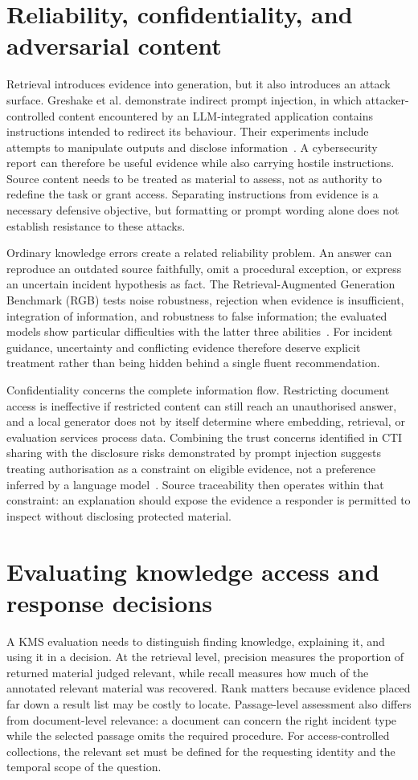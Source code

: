 \section{Reliability, confidentiality, and adversarial content}
Retrieval introduces evidence into generation, but it also introduces an attack surface. Greshake et al. demonstrate indirect prompt injection, in which attacker-controlled content encountered by an LLM-integrated application contains instructions intended to redirect its behaviour. Their experiments include attempts to manipulate outputs and disclose information~\cite{ref045}. A cybersecurity report can therefore be useful evidence while also carrying hostile instructions. Source content needs to be treated as material to assess, not as authority to redefine the task or grant access. Separating instructions from evidence is a necessary defensive objective, but formatting or prompt wording alone does not establish resistance to these attacks.

Ordinary knowledge errors create a related reliability problem. An answer can reproduce an outdated source faithfully, omit a procedural exception, or express an uncertain incident hypothesis as fact. The Retrieval-Augmented Generation Benchmark (RGB) tests noise robustness, rejection when evidence is insufficient, integration of information, and robustness to false information; the evaluated models show particular difficulties with the latter three abilities~\cite{ref038}. For incident guidance, uncertainty and conflicting evidence therefore deserve explicit treatment rather than being hidden behind a single fluent recommendation.

Confidentiality concerns the complete information flow. Restricting document access is ineffective if restricted content can still reach an unauthorised answer, and a local generator does not by itself determine where embedding, retrieval, or evaluation services process data. Combining the trust concerns identified in CTI sharing with the disclosure risks demonstrated by prompt injection suggests treating authorisation as a constraint on eligible evidence, not a preference inferred by a language model~\cite{ref098,ref045}. Source traceability then operates within that constraint: an explanation should expose the evidence a responder is permitted to inspect without disclosing protected material.

\section{Evaluating knowledge access and response decisions}
A KMS evaluation needs to distinguish finding knowledge, explaining it, and using it in a decision. At the retrieval level, precision measures the proportion of returned material judged relevant, while recall measures how much of the annotated relevant material was recovered. Rank matters because evidence placed far down a result list may be costly to locate. Passage-level assessment also differs from document-level relevance: a document can concern the right incident type while the selected passage omits the required procedure. For access-controlled collections, the relevant set must be defined for the requesting identity and the temporal scope of the question.

